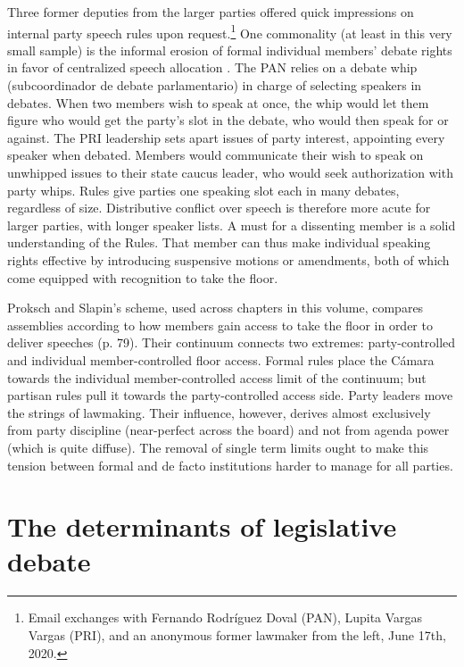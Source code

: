 \documentclass[letter,12pt]{article}
\begin{document}
Three former deputies from the larger parties offered quick impressions on internal party speech rules upon request.\footnote{Email exchanges with Fernando Rodríguez Doval (PAN), Lupita Vargas Vargas (PRI), and an anonymous former lawmaker from the left, June 17th, 2020.} One commonality (at least in this very small sample) is the informal erosion of formal individual members' debate rights in favor of centralized speech allocation \citep[cf.][]{cox.1987}. The PAN relies on a debate whip (subcoordinador de debate parlamentario) in charge of selecting speakers in debates. When two members wish to speak at once, the whip would let them figure who would get the party's slot in the debate, who would then speak for or against. The PRI leadership sets apart issues of party interest, appointing every speaker when debated. Members would communicate their wish to speak on unwhipped issues to their state caucus leader, who would seek authorization with party whips. Rules give parties one speaking slot each in many debates, regardless of size. Distributive conflict over speech is therefore more acute for larger parties, with longer speaker lists. A must for a dissenting member is a solid understanding of the Rules. That member can thus make individual speaking rights effective by introducing suspensive motions or amendments, both of which come equipped with recognition to take the floor. 

Proksch and Slapin's \citeyearpar{proksch-slapin2015book} scheme, used across chapters in this volume, compares assemblies according to how members gain access to take the floor in order to deliver speeches (p. 79). Their continuum connects two extremes: party-controlled and individual member-controlled floor access. Formal rules place the Cámara towards the individual member-controlled access limit of the continuum; but partisan rules pull it towards the party-controlled access side. Party leaders move the strings of lawmaking. Their influence, however, derives almost exclusively from party discipline (near-perfect across the board) and not from agenda power (which is quite diffuse). The removal of single term limits ought to make this tension between formal and de facto institutions harder to manage for all parties.  


\section{The determinants of legislative debate} %
 
\end{document}
